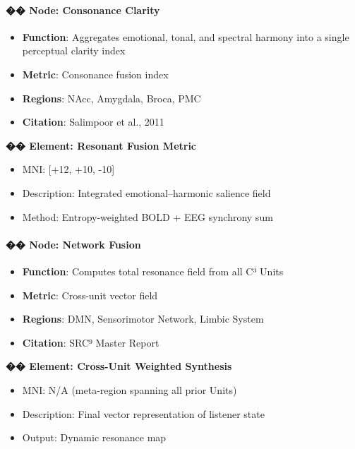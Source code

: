 \paragraph{�� Node: Consonance Clarity}

\begin{itemize}
    \item \textbf{Function}: Aggregates emotional, tonal, and spectral harmony into a single perceptual clarity index
    \item \textbf{Metric}: Consonance fusion index
    \item \textbf{Regions}: NAcc, Amygdala, Broca, PMC
    \item \textbf{Citation}: Salimpoor et al., 2011
\end{itemize}

\textbf{�� Element: Resonant Fusion Metric}

\begin{itemize}
    \item MNI: [+12, +10, -10]
    \item Description: Integrated emotional–harmonic salience field
    \item Method: Entropy-weighted BOLD + EEG synchrony sum
\end{itemize}

\paragraph{�� Node: Network Fusion}

\begin{itemize}
    \item \textbf{Function}: Computes total resonance field from all C³ Units
    \item \textbf{Metric}: Cross-unit vector field
    \item \textbf{Regions}: DMN, Sensorimotor Network, Limbic System
    \item \textbf{Citation}: SRC⁹ Master Report
\end{itemize}

\textbf{�� Element: Cross-Unit Weighted Synthesis}

\begin{itemize}
    \item MNI: N/A (meta-region spanning all prior Units)
    \item Description: Final vector representation of listener state
    \item Output: Dynamic resonance map
\end{itemize}


